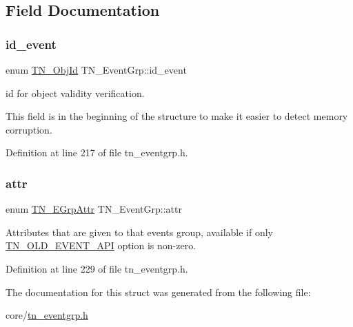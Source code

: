 \subsection{Field Documentation}
\mbox{\label{structTN__EventGrp_a0bdf55b6117237122efeefcdf6802d37}} 
\subsubsection{\texorpdfstring{id\+\_\+event}{id\_event}}
{\footnotesize\ttfamily enum \hyperlink{tn__common_8h_ae779dd1f6735f6e139fb70acd004d976}{T\+N\+\_\+\+Obj\+Id} T\+N\+\_\+\+Event\+Grp\+::id\+\_\+event}



id for object validity verification. 

This field is in the beginning of the structure to make it easier to detect memory corruption. 

Definition at line 217 of file tn\+\_\+eventgrp.\+h.

\mbox{\label{structTN__EventGrp_ac247c74950bd8ae6f721ff220e5a2402}} 
\subsubsection{\texorpdfstring{attr}{attr}}
{\footnotesize\ttfamily enum \hyperlink{tn__eventgrp_8h_aca5ed3b60cdaa2e2db8b88f4b5e33d3f}{T\+N\+\_\+\+E\+Grp\+Attr} T\+N\+\_\+\+Event\+Grp\+::attr}



Attributes that are given to that events group, available if only {\ttfamily \hyperlink{tn__cfg__default_8h_ac61d5f6a716cdcab205a2c8afbde4242}{T\+N\+\_\+\+O\+L\+D\+\_\+\+E\+V\+E\+N\+T\+\_\+\+A\+PI}} option is non-\/zero. 



Definition at line 229 of file tn\+\_\+eventgrp.\+h.



The documentation for this struct was generated from the following file\+:\begin{DoxyCompactItemize}
\item 
core/\hyperlink{tn__eventgrp_8h}{tn\+\_\+eventgrp.\+h}\end{DoxyCompactItemize}
